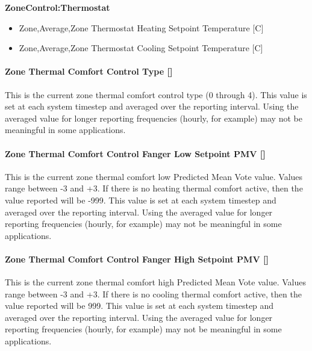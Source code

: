 \textbf{ZoneControl:Thermostat}

\begin{itemize}
\item
  Zone,Average,Zone Thermostat Heating Setpoint Temperature {[}C{]}
\item
  Zone,Average,Zone Thermostat Cooling Setpoint Temperature {[}C{]}
\end{itemize}

\paragraph{\texorpdfstring{Zone Thermal Comfort Control Type {[]}}{Zone Thermal Comfort Control Type }}\label{zone-thermal-comfort-control-type}

This is the current zone thermal comfort control type (0 through 4). This value is set at each system timestep and averaged over the reporting interval. Using the averaged value for longer reporting frequencies (hourly, for example) may not be meaningful in some applications.

\paragraph{\texorpdfstring{Zone Thermal Comfort Control Fanger Low Setpoint PMV {[]}}{Zone Thermal Comfort Control Fanger Low Setpoint PMV }}\label{zone-thermal-comfort-control-fanger-low-setpoint-pmv}

This is the current zone thermal comfort low Predicted Mean Vote value. Values range between -3 and +3. If there is no heating thermal comfort active, then the value reported will be -999. This value is set at each system timestep and averaged over the reporting interval. Using the averaged value for longer reporting frequencies (hourly, for example) may not be meaningful in some applications.

\paragraph{\texorpdfstring{Zone Thermal Comfort Control Fanger High Setpoint PMV {[]}}{Zone Thermal Comfort Control Fanger High Setpoint PMV }}\label{zone-thermal-comfort-control-fanger-high-setpoint-pmv}

This is the current zone thermal comfort high Predicted Mean Vote value. Values range between -3 and +3. If there is no cooling thermal comfort active, then the value reported will be 999. This value is set at each system timestep and averaged over the reporting interval. Using the averaged value for longer reporting frequencies (hourly, for example) may not be meaningful in some applications.

